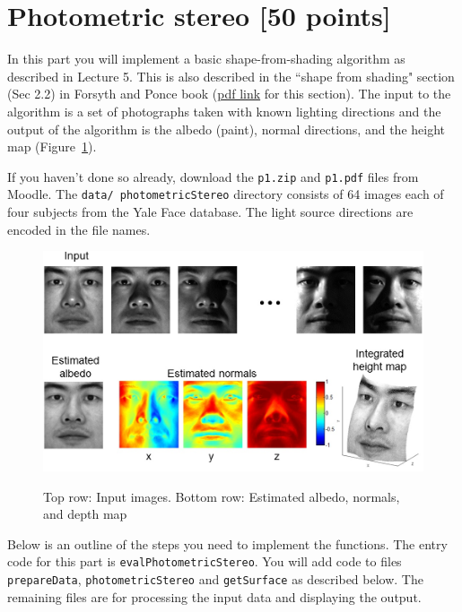 \documentclass[10pt,letterpaper]{article}
\newcommand{\cmd}[1] {{\color{blue}\texttt{#1}}}
\begin{document}
\newpage

\section{Photometric stereo [50 points]}


In this part you will implement a basic shape-from-shading algorithm as described in Lecture 5. This is also described in the ``shape from shading" section (Sec 2.2) in Forsyth and Ponce book (\href{http://www.sci.utah.edu/~gerig/CS6320-S2012/Materials/Forsyth-Ponce-SfS.pdf}{pdf link} for this section). The input to the algorithm is a set of photographs taken with known lighting directions and the output of the algorithm is the albedo (paint), normal directions, and the height map (Figure~\ref{fig:photometric-stereo}).


If you haven't done so already, download the \cmd{p1.zip} and \cmd{p1.pdf} files from Moodle. The \cmd{data/ photometricStereo} directory consists of 64 images each of four subjects from the Yale Face database. The light source directions are encoded in the file names. 


\begin{figure}[h]
\centering
\includegraphics[width=0.85\linewidth]{shape_from_shading.jpg} \\
\caption{\label{fig:photometric-stereo} Top row: Input images. Bottom row: Estimated albedo, normals, and depth map}
\end{figure}


Below is an outline of the steps you need to implement the functions. The entry code for this part is \cmd{evalPhotometricStereo}. You will add code to files \cmd{prepareData}, \cmd{photometricStereo} and \cmd{getSurface} as described below. The remaining files are for processing the input data and displaying the output.
\end{document}
